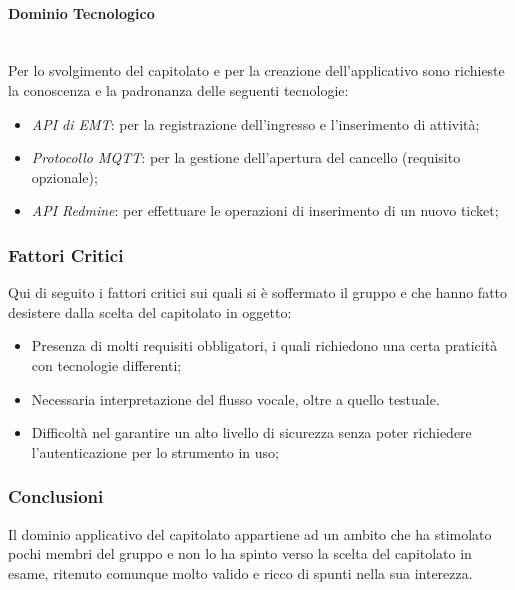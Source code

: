 \documentclass[11pt]{article}
\begin{document}
        \paragraph{Dominio Tecnologico}~\\
        
        Per lo svolgimento del capitolato e per la creazione dell'applicativo sono richieste la conoscenza e la padronanza
        delle seguenti tecnologie:
        \begin{itemize}
            \item \textit{API di EMT}: per la registrazione dell'ingresso e l'inserimento di attività;
            \item \textit{Protocollo MQTT}: per la gestione dell'apertura del cancello (requisito opzionale);
            \item \textit{API Redmine}: per effettuare le operazioni di inserimento di un nuovo ticket;
        \end{itemize}
    
    \subsubsection{Fattori Critici}
    Qui di seguito i fattori critici sui quali si è soffermato il gruppo e che hanno fatto desistere dalla scelta del capitolato in
    oggetto:
    	\begin{itemize}
            \item Presenza di molti requisiti obbligatori, i quali richiedono una certa praticità con tecnologie differenti;
            \item Necessaria interpretazione del flusso vocale, oltre a quello testuale.
            \item Difficoltà nel garantire un alto livello di sicurezza senza poter richiedere l'autenticazione per lo strumento in uso;
        \end{itemize}
        
    \subsubsection{Conclusioni}
    Il dominio applicativo del capitolato appartiene ad un ambito che ha stimolato pochi membri del gruppo e non lo ha spinto verso
    la scelta del capitolato in esame, ritenuto comunque molto valido e ricco di spunti nella sua interezza.
    
    \newpage
\end{document}
